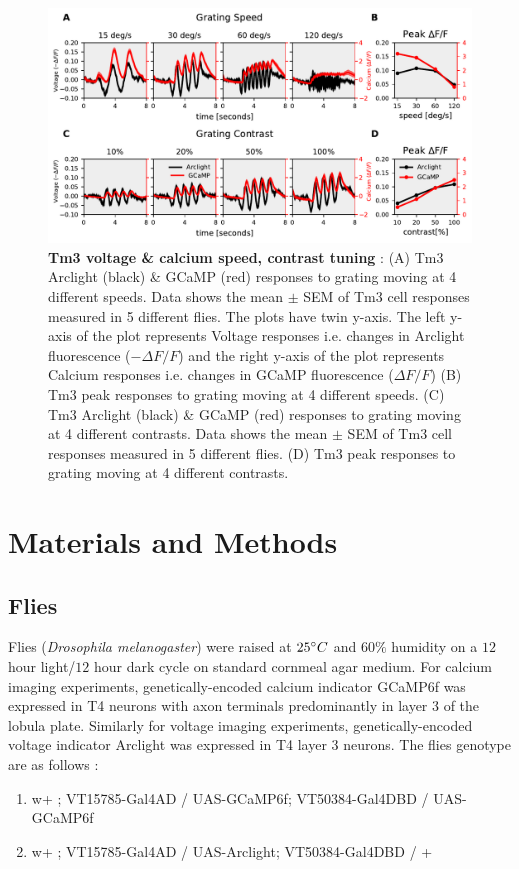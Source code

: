 \documentclass[9pt,lineno]{elife}
\begin{document}
\begin{figure}
\begin{fullwidth}
\includegraphics[width=0.84\linewidth]{figure8}
\caption{\textbf{Tm3 voltage \& calcium speed, contrast tuning} : (A) Tm3 Arclight (black) \& GCaMP (red) responses to grating moving at 4 different speeds. Data shows the mean $\pm$ SEM of Tm3 cell responses measured in 5 different flies. The plots have twin y-axis. The left y-axis of the plot represents Voltage responses i.e. changes in Arclight fluorescence ($-\Delta F/F$) and the right y-axis of the plot represents Calcium responses i.e. changes in GCaMP fluorescence ($\Delta F/F$) (B) Tm3 peak responses to grating moving at 4 different speeds. (C) Tm3 Arclight (black) \& GCaMP (red) responses to grating moving at 4 different contrasts. Data shows the mean $\pm$ SEM of Tm3 cell responses measured in 5 different flies. (D) Tm3 peak responses to grating moving at 4 different contrasts.}

\label{Tm3data}
	
\end{fullwidth}
\end{figure} 




\section{Materials and Methods}
\subsection{Flies}
Flies (\textit{Drosophila melanogaster}) were raised at $25\degree C$ and $60\%$ humidity on a $12$ hour light/$12$ hour dark cycle on standard cornmeal agar medium. For calcium imaging experiments, genetically-encoded calcium indicator GCaMP6f \parencite{Chen2013} was expressed in T4 neurons with axon terminals predominantly in  layer 3 of the lobula plate. Similarly for voltage imaging experiments, genetically-encoded voltage indicator Arclight \parencite{Jin2012} was expressed in T4 layer 3 neurons. The flies genotype are as follows : 
\begin{enumerate}
\item w+ ; VT15785-Gal4AD / UAS-GCaMP6f; VT50384-Gal4DBD / UAS-GCaMP6f 
\item w+ ; VT15785-Gal4AD / UAS-Arclight; VT50384-Gal4DBD / + 
\end{enumerate}
\end{document}
